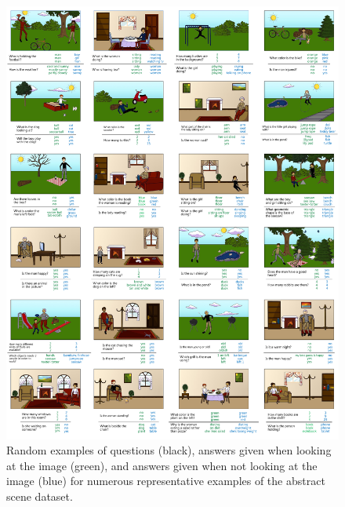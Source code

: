\begin{figure}[t]
\centering
\includegraphics[width=1\linewidth]{figures/abstract_examples-compressed.pdf}
\caption{Random examples of questions (black),  answers given when looking at the image (green), and answers given when not looking at the image (blue) for numerous representative examples of the abstract scene dataset.}
\label{fig:abstract_more_examples}
\end{figure}

